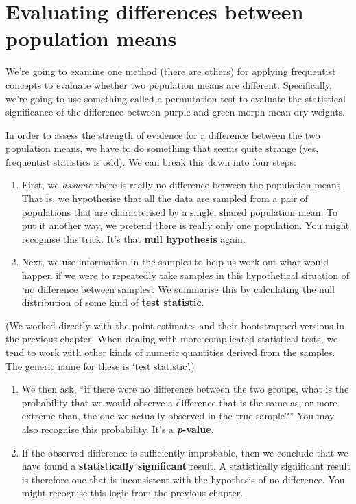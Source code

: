 \documentclass[]{book}
\begin{document}
\section{Evaluating differences between population
means}\label{evaluating-differences-between-population-means}

We're going to examine one method (there are others) for applying
frequentist concepts to evaluate whether two population means are
different. Specifically, we're going to use something called a
permutation test to evaluate the statistical significance of the
difference between purple and green morph mean dry weights.

In order to assess the strength of evidence for a difference between the
two population means, we have to do something that seems quite strange
(yes, frequentist statistics is odd). We can break this down into four
steps:

\begin{enumerate}
\def\labelenumi{\arabic{enumi}.}
\item
  First, we \emph{assume} there is really no difference between the
  population means. That is, we hypothesise that all the data are
  sampled from a pair of populations that are characterised by a single,
  shared population mean. To put it another way, we pretend there is
  really only one population. You might recognise this trick. It's that
  \textbf{null hypothesis} again.
\item
  Next, we use information in the samples to help us work out what would
  happen if we were to repeatedly take samples in this hypothetical
  situation of `no difference between samples'. We summarise this by
  calculating the null distribution of some kind of \textbf{test
  statistic}.
\end{enumerate}

(We worked directly with the point estimates and their bootstrapped
versions in the previous chapter. When dealing with more complicated
statistical tests, we tend to work with other kinds of numeric
quantities derived from the samples. The generic name for these is `test
statistic'.)

\begin{enumerate}
\def\labelenumi{\arabic{enumi}.}
\setcounter{enumi}{2}
\item
  We then ask, ``if there were no difference between the two groups,
  what is the probability that we would observe a difference that is the
  same as, or more extreme than, the one we actually observed in the
  true sample?'' You may also recognise this probability. It's a
  \textbf{\emph{p}-value}.
\item
  If the observed difference is sufficiently improbable, then we
  conclude that we have found a \textbf{statistically significant}
  result. A statistically significant result is therefore one that is
  inconsistent with the hypothesis of no difference. You might recognise
  this logic from the previous chapter.
\end{enumerate}
\end{document}
